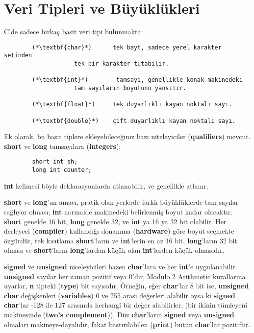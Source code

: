 \documentclass[a4paper,12pt,oneside]{book}
\begin{document}
\section{Veri Tipleri ve Büyüklükleri}
C'de sadece birkaç basit veri tipi bulunmakta:
\begin{lstlisting}
		(*\textbf{char}*)      tek bayt, sadece yerel karakter setinden
					tek bir karakter tutabilir.

		(*\textbf{int}*)        tamsayı, genellikle konak makinedeki
					tam sayıların boyutunu yansıtır.

		(*\textbf{float}*)     tek duyarlıklı kayan noktalı sayı.

		(*\textbf{double}*)    çift duyarlıklı kayan noktalı sayı.
\end{lstlisting}
\par Ek olarak, bu basit tiplere ekleyebileceğiniz bazı niteleyiciler (\textbf{qualifiers}) mevcut. \textbf{short} ve \textbf{long} tamsayılara (\textbf{integers}):
\begin{lstlisting}
		short int sh;
		long int counter;
\end{lstlisting}
\textbf{int} kelimesi böyle deklarasyonlarda atlanabilir, ve genellikle atlanır.
\par \textbf{short} ve \textbf{long}'un amacı, pratik olan yerlerde farklı büyüklüklerde tam sayılar sağlıyor olması; \textbf{int} normalde makinedeki belirlenmiş boyut kadar olacaktır. \textbf{short} genelde 16 bit, \textbf{long} genelde 32, ve \textbf{int} ya 16 ya 32 bit olabilir. Her derleyeci (\textbf{compiler}) kullandığı donanıma (\textbf{hardware}) göre boyut seçmekte özgürdür, tek kısıtlama \textbf{short}'ların ve \textbf{int}'lerin en az 16 bit, \textbf{long}'ların 32 bit olması ve \textbf{short}'ların \textbf{long}'lardan küçük olan \textbf{int}'lerden küçük olmasıdır.
\par \textbf{signed} ve \textbf{unsigned} niceleyicileri bazen \textbf{char}'lara ve her \textbf{int}'e uygulanabilir. \textbf{unsigned} sayılar her zaman pozitif veya 0'dır, Modulo 2 Arithmetic kurallarına uyarlar, \textbf{n} tipteki (\textbf{type}) bit sayısıdır. Örneğin, eğer \textbf{char}'lar 8 bit ise, \textbf{unsigned char} değişkenleri (\textbf{variables}) 0 ve 255 arası değerleri alabilir oysa ki \textbf{signed char}'lar -128 ile 127 arasında herhangi bir değer alabilirler. (bir ikinin tümleyeni makinesinde (\textbf{two's complement})). Düz \textbf{char}'ların \textbf{signed} veya \textbf{unsigned} olmaları makineye-dayalıdır, fakat bastırılabilen (\textbf{print}) bütün \textbf{char}'lar pozitiftir.
\end{document}
